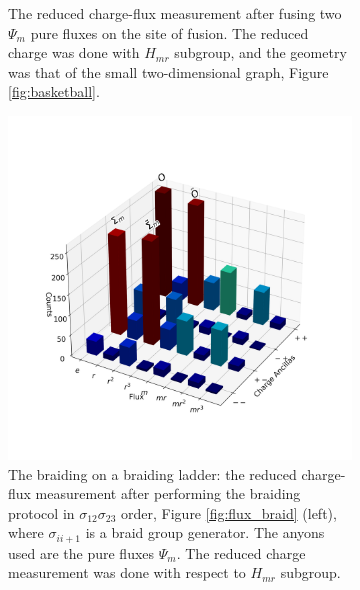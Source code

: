 \documentclass[two column]{article}
\begin{document}
\begin{figure}
\begin{subfigure}{0.47\textwidth}
    \caption{The reduced charge-flux measurement after fusing two $\Psi_m$ pure fluxes on the site of fusion. The reduced charge was done with $H_{mr}$ subgroup, and the geometry was that of the small two-dimensional graph, Figure \ref{fig:basketball}.}
    \label{fig:fusion_basketball}
\end{subfigure}
\vspace{15pt}
\begin{subfigure}{0.47\textwidth}
    \includegraphics[width=\linewidth]{Figures/braid_fusion.png}
    \caption{The braiding on a braiding ladder: the reduced charge-flux measurement after performing the braiding protocol in $\sigma_{12}\sigma_{23}$ order, Figure \ref{fig:flux_braid} (left), where $\sigma_{ii+1}$ is a braid group generator. The anyons used are the pure fluxes $\Psi_m$. The reduced charge measurement was done with respect to $H_{mr}$ subgroup.} 
    \label{fig:braid_fuse}
\end{subfigure}\hfill
\begin{subfigure}{0.47\textwidth}

\end{subfigure}
\end{figure}
\end{document}
